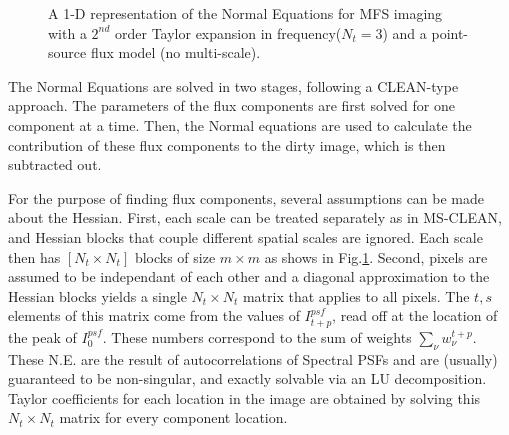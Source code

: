 \documentclass[structabstract]{aa}
\newcommand{\wntp}{{w_{\nu}^{t+p}}}
\begin{document}
\begin{figure}[]
\caption{A 1-D representation of the Normal Equations for MFS imaging with a $2^{nd}$ order
	Taylor expansion in frequency($N_t=3$) and a point-source flux model (no multi-scale).
}
\label{FIG_NEQN_1}
\end{figure}

The Normal Equations are solved in two stages, following a CLEAN-type approach.
The parameters of the flux components are first solved for one component at a time.
Then, the Normal equations are used to calculate the contribution of these flux components
to the dirty image, which is then subtracted out.

For the purpose of finding flux components, several assumptions can be made about the Hessian.
First, each scale can be treated separately as in MS-CLEAN, and Hessian blocks that couple
different spatial scales are ignored. Each scale then has $[N_t \times N_t]$ blocks of size
$m\times m$ as shows in Fig.\ref{FIG_NEQN_1}.
Second, pixels are assumed to be independant of each other and a 
diagonal approximation to the Hessian blocks yields a single $N_t \times N_t$ matrix 
that applies to all pixels. The $t,s$ elements of this matrix come from the values of
$I^{psf}_{t+p}$, read off at the location of the peak of $I^{psf}_0$. These numbers
correspond to the sum of weights $\sum_{\nu} \wntp$.
These N.E. are the result of autocorrelations of Spectral PSFs and are 
(usually) guaranteed to be non-singular, and exactly solvable via an LU decomposition.
Taylor coefficients for each location in the image are obtained by
solving this $N_t \times N_t$ matrix for every component location.
\end{document}
